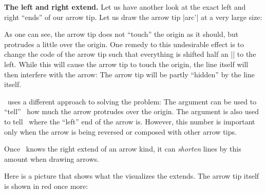 \begin{command}{\pgfarrowsdeclare{}}
  \textbf{The left and right extend.}
  Let us have another look at the exact left and right ``ends'' of our
  arrow tip. Let us draw the arrow tip |arc'| at a very large size:

\begin{codeexample}[]
\end{codeexample}

  As one can see, the arrow tip does not ``touch'' the origin as it
  should, but protrudes a little over the origin. One remedy to this
  undesirable effect is to change the code of the arrow tip such that
  everything is shifted half an |\arrowsize| to the left. While this
  will cause the arrow tip to touch the origin, the line itself will
  then interfere with the arrow: The arrow tip will be partly
  ``hidden'' by the line itself.

  \pgfname\ uses a different approach to solving the problem: The
   argument can be used to ``tell'' \pgfname\ how
  much the arrow protrudes over the origin. The argument is also used
  to tell \pgfname\ where the ``left'' end of the arrow is. However,
  this number is important only when the arrow is being reversed or
  composed with other arrow tips.

  Once \pgfname\ knows the right extend of an arrow kind, it can
  \emph{shorten} lines by this amount when drawing arrows.

  Here is a picture that shows what the visualizes the extends. The
  arrow tip itself is shown in red once more:

  \medskip
\end{command}
